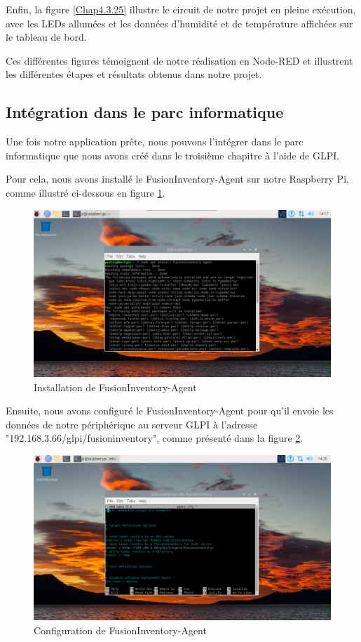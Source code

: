 Enfin, la figure \ref{Chap4.3.25} illustre le circuit de notre projet en pleine exécution, avec les LEDs allumées et les données d'humidité et de température affichées sur le tableau de bord.

Ces différentes figures témoignent de notre réalisation en Node-RED et illustrent les différentes étapes et résultats obtenus dans notre projet.


\subsection{Intégration dans le parc informatique}

Une fois notre application prête, nous pouvons l'intégrer dans le parc informatique que nous avons créé dans le troisième chapitre à l'aide de GLPI.

Pour cela, nous avons installé le FusionInventory-Agent sur notre Raspberry Pi, comme illustré ci-dessous en figure \ref{fig:raspberry-fusion}.

\begin{figure}[H]
\centering
\includegraphics[width=15cm]{Images/raspberryfusion.png}
\caption{Installation de FusionInventory-Agent}
\label{fig:raspberry-fusion}
\end{figure}

Ensuite, nous avons configuré le FusionInventory-Agent pour qu'il envoie les données de notre périphérique au serveur GLPI à l'adresse "192.168.3.66/glpi/fusioninventory", comme présenté dans la figure \ref{fig:raspberry-fusion-config}.

\begin{figure}[H]
\centering
\includegraphics[width=15cm]{Images/raspberryfusion1.png}
\caption{Configuration de FusionInventory-Agent}
\label{fig:raspberry-fusion-config}
\end{figure}

